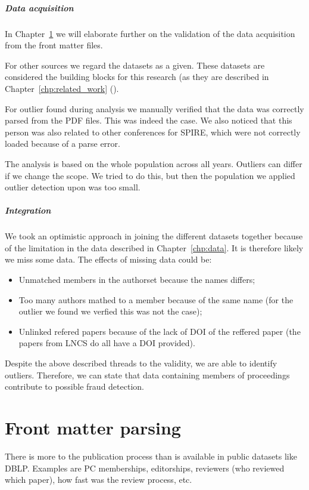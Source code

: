 \documentclass{ou-report}
\begin{document}
\paragraph{Data acquisition}
In Chapter~\ref{chp:front_matter_parsing} we will elaborate further on the 
validation of the data acquisition from the front matter files.

For other sources we regard the datasets as a given. These datasets are 
considered the building blocks for this research (as they are described in 
Chapter~\ref{chp:related_work} ().

For outlier found during analysis we manually verified that the data was 
correctly parsed from the PDF files. This was
indeed the case. We also noticed that this person was also related to other
conferences
for SPIRE, which were not correctly loaded because of a parse error.

The analysis is based on the whole population across all years. Outliers can
differ if we change the scope. We tried to do this, but then the population
we applied outlier detection upon was too small. 

\paragraph{Integration}
We took an optimistic approach in joining the different datasets together 
because of the limitation in the data described in Chapter~\ref{chp:data}. It
is therefore likely we miss some data. The effects of missing data could be:
\begin{itemize}
    \item Unmatched members in the authorset because the names differs;
    \item Too many authors mathed to a member because of the same name (for
    the outlier we found we verfied this was not the case);
    \item Unlinked refered papers because of the lack of DOI of the reffered 
    paper (the papers from LNCS do all have a DOI provided).
\end{itemize}

Despite the above described threads to the validity, we are able to identify 
outliers. Therefore, we can state that data containing members of proceedings 
contribute to possible fraud detection.

\chapter{Front matter parsing}
\label{chp:front_matter_parsing}
There is more to the publication process than is available in public
datasets like DBLP. Examples are PC memberships, editorships, reviewers (who
reviewed which paper), how fast was the review process, etc.
\end{document}
